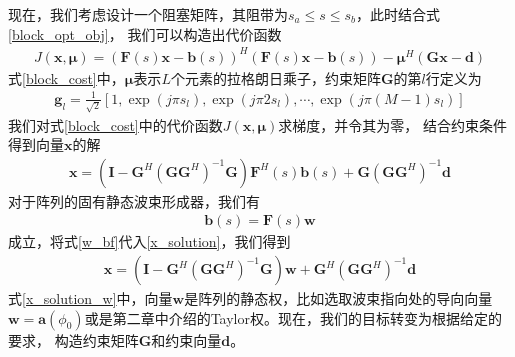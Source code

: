 \documentclass[master]{thesis-uestc}
\begin{document}
现在，我们考虑设计一个阻塞矩阵，其阻带为$s_a\le s \le s_b$，此时结合式\eqref{block_opt_obj}，
我们可以构造出代价函数
\begin{equation}\label{block_cost}
    \begin{aligned}
        J(\bm{x},\bm{\mu}) = \left(\bm{F}(s)\bm{x}-\bm{b}(s)\right)^H\left(\bm{F}(s)\bm{x}-\bm{b}(s)\right)
                    -\bm{\mu}^H\left(\bm{G}\bm{x}-\bm{d}\right)
    \end{aligned}
\end{equation}
式\eqref{block_cost}中，$\bm{\mu}$表示$L$个元素的拉格朗日乘子，约束矩阵$\bm{G}$的第$l$行定义为
\begin{equation}
    \begin{aligned}
        \bm{g}_l = \frac{1}{\sqrt{2}}\left[1,\exp\left(j\pi s_l\right), 
                                           \exp\left(j\pi2 s_l\right), \cdots,
                                           \exp\left(j\pi(M-1)s_l\right)
                                      \right]
    \end{aligned}
\end{equation}
我们对式\eqref{block_cost}中的代价函数$J(\bm{x},\bm{\mu})$求梯度，并令其为零，
结合约束条件得到向量$\bm{x}$的解
\begin{equation}\label{x_solution}
    \begin{aligned}
        \bm{x} = \left(\bm{I}-\bm{G}^H(\bm{G}\bm{G}^H)^{-1}\bm{G}\right)\bm{F}^H(s)\bm{b}(s) + 
                 \bm{G}(\bm{G}\bm{G}^H)^{-1}\bm{d}
    \end{aligned}
\end{equation}
对于阵列的固有静态波束形成器，我们有
\begin{equation}\label{w_bf}
    \begin{aligned}
        \bm{b}(s) = \bm{F}(s)\bm{w}
    \end{aligned}
\end{equation}
成立，将式\eqref{w_bf}代入\eqref{x_solution}，我们得到
\begin{equation}\label{x_solution_w}
    \begin{aligned}
        \bm{x} = \left(\bm{I}-\bm{G}^H(\bm{G}\bm{G}^H)^{-1}\bm{G}\right)\bm{w} + 
                 \bm{G}^H(\bm{G}\bm{G}^H)^{-1}\bm{d}
    \end{aligned}
\end{equation}
式\eqref{x_solution_w}中，向量$\bm{w}$是阵列的静态权，比如选取波束指向处的导向向量
$\bm{w}=\bm{a}(\phi_0)$或是第二章中介绍的Taylor权。现在，我们的目标转变为根据给定的要求，
构造约束矩阵$\bm{G}$和约束向量$\bm{d}$。
\end{document}
